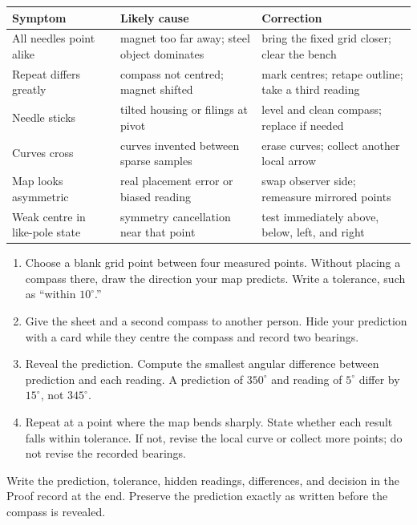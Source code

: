 \newpage
{}
\small
{}
\begin{tabularx}{\linewidth}{@{}p{.22\linewidth}L L@{}}
\toprule
Symptom & Likely cause & Correction\\
\midrule
All needles point alike & magnet too far away; steel object dominates &
bring the fixed grid closer; clear the bench\\
Repeat differs greatly & compass not centred; magnet shifted &
mark centres; retape outline; take a third reading\\
Needle sticks & tilted housing or filings at pivot &
level and clean compass; replace if needed\\
Curves cross & curves invented between sparse samples &
erase curves; collect another local arrow\\
Map looks asymmetric & real placement error or biased reading &
swap observer side; remeasure mirrored points\\
Weak centre in like-pole state & symmetry cancellation near that point &
test immediately above, below, left, and right\\
\bottomrule
\end{tabularx}

\begin{enumerate}
\item Choose a blank grid point between four measured points. Without placing
a compass there, draw the direction your map predicts. Write a tolerance,
such as ``within \(10^\circ\).''
\item Give the sheet and a second compass to another person. Hide your
prediction with a card while they centre the compass and record two bearings.
\item Reveal the prediction. Compute the smallest angular difference between
prediction and each reading. A prediction of \(350^\circ\) and reading of
\(5^\circ\) differ by \(15^\circ\), not \(345^\circ\).
\item Repeat at a point where the map bends sharply. State whether each result
falls within tolerance. If not, revise the local curve or collect more points;
do not revise the recorded bearings.
\end{enumerate}

Write the prediction, tolerance, hidden readings, differences, and decision in
the Proof record at the end. Preserve the prediction exactly as written before
the compass is revealed.

